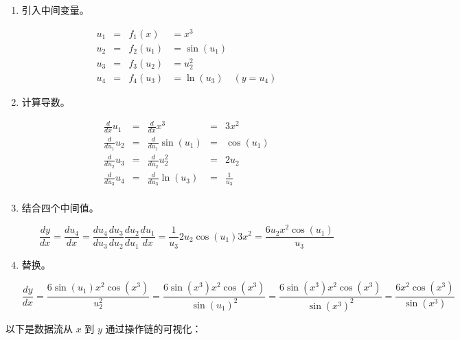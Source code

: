 \documentclass[11pt]{article}
\begin{document}
\begin{enumerate}
\item 引入中间变量。

\[
\begin{array}{lllllllll}
 u_1 &=& f_1(x) &= x^3\\
 u_2 &= &f_2(u_1) &= \sin(u_1)\\
 u_3 &= &f_3(u_2) &= u_2^2\\
 u_4 &=& f_4(u_3) &= \ln(u_3) \quad (y = u_4)
\end{array}
\]

\item 计算导数。

\[
\begin{array}{lllllllll}
 \frac{d}{dx} u_1 & = & \frac{d}{dx} x^3 & = & 3x^2\\
 \frac{d}{du_1} u_2 & = & \frac{d}{du_1} \sin(u_1) & = & \cos(u_1) \\
 \frac{d}{du_2} u_3 & = & \frac{d}{du_2} u_2^2 & =& 2u_2\\
 \frac{d}{du_3} u_4 & = & \frac{d}{du_3} \ln(u_3) & =& \frac{1}{u_3}\\
\end{array}
\]

\item 结合四个中间值。

\[
\frac{dy}{dx} = \frac{d u_4}{dx} = \frac{d u_4}{du_3}\frac{du_3}{d u_2} \frac{du_2}{du_1} \frac{du_1}{dx} = \frac{1}{u_3}  2u_2  \cos(u_1)  3x^2 = \frac{6u_2x^2\cos(u_1)}{u_3}
\]

\item 替换。

\[
\frac{dy}{dx} = \frac{6\sin(u_1)x^2\cos(x^3)}{u_2^2} = \frac{6\sin(x^3)x^2\cos(x^3)}{\sin(u_1)^2} = \frac{6\sin(x^3)x^2\cos(x^3)}{\sin(x^3)^2} = \frac{6x^2\cos(x^3)}{\sin(x^3)}
\]
\end{enumerate}

以下是数据流从 $x$ 到 $y$ 通过操作链的可视化：
\end{document}
